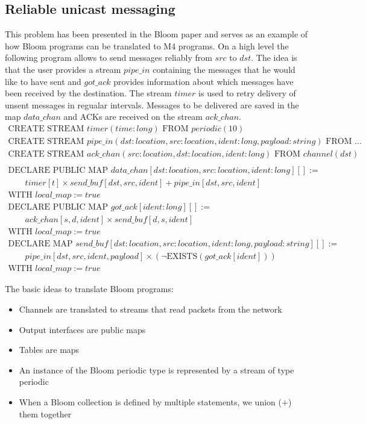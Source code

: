 \documentclass[10pt]{article}
\begin{document}
\subsection{Reliable unicast messaging}
This problem has been presented in the Bloom paper and serves as an example of how Bloom programs can be translated to M4 programs.
On a high level the following program allows to send messages reliably from $src$ to $dst$.
The idea is that the user provides a stream $pipe\_in$ containing the messages that he would like to have sent and $got\_ack$ provides information about which messages have been received by the destination.
The stream $timer$ is used to retry delivery of unsent messages in regualar intervals.
Messages to be delivered are saved in the map $data\_chan$ and ACKs are received on the stream $ack\_chan$.
\[
\begin{array}{l}
\text{CREATE STREAM } timer(time: long) \text{ FROM } periodic(10) \\
\text{CREATE STREAM } pipe\_in(dst : location, src : location, ident : long, payload : string) \text{ FROM } ... \\
\text{CREATE STREAM } ack\_chan(src : location, dst : location, ident : long) \text{ FROM } channel(dst)\\
\\
\text{DECLARE PUBLIC MAP } data\_chan [dst : location, src : location, ident : long][] := \\
\qquad timer[t] \times send\_buf[dst, src, ident] + pipe\_in[dst, src, ident]\\
\text{WITH } local\_map := true \\
\text{DECLARE PUBLIC MAP } got\_ack [ident : long][] := \\
\qquad ack\_chan[s, d, ident] \times send\_buf[d, s, ident]\\
\text{WITH } local\_map := true \\
\text{DECLARE MAP } send\_buf [dst : location, src : location, ident : long, payload : string][] := \\
\qquad pipe\_in[dst, src, ident, payload] \times (\neg\text{EXISTS}(got\_ack[ident])) \\
\text{WITH } local\_map := true
\end{array}
\]

The basic ideas to translate Bloom programs:
\begin{itemize}
\item Channels are translated to streams that read packets from the network
\item Output interfaces are public maps
\item Tables are maps
\item An instance of the Bloom periodic type is represented by a stream of type periodic
\item When a Bloom collection is defined by multiple statements, we union ($+$) them together
\end{itemize} 
\end{document}
